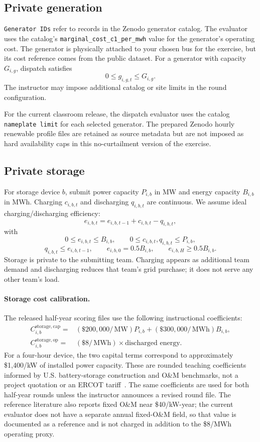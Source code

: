 \documentclass[12pt]{article}
\newcommand{\code}[1]{\texttt{#1}}
\newcommand{\MW}{\,\mathrm{MW}}
\newcommand{\MWh}{\,\mathrm{MWh}}
\newcommand{\USD}{\$}
\begin{document}
\subsection{Private generation}

\code{Generator IDs} refer to records in the Zenodo generator catalog. The evaluator
uses the catalog's \code{marginal\_cost\_c1\_per\_mwh} value for the generator's
operating cost. The generator is physically attached to your chosen bus for the
exercise, but its cost reference comes from the public dataset. For a generator
with capacity $G_{i,g}$, dispatch satisfies
\[
  0\le g_{i,g,t}\le G_{i,g}.
\]
The instructor may impose additional catalog or site limits in the round
configuration.

For the current classroom release, the dispatch evaluator uses the catalog
\code{nameplate limit} for each selected generator. The prepared Zenodo hourly
renewable profile files are retained as source metadata but are not imposed as
hard availability caps in this no-curtailment version of the exercise.

\subsection{Private storage}

For storage device $b$, submit power capacity $P_{i,b}$ in MW and energy
capacity $B_{i,b}$ in MWh. Charging $c_{i,b,t}$ and discharging $q_{i,b,t}$ are
continuous. We assume ideal charging/discharging efficiency:
\[
  e_{i,b,t}=e_{i,b,t-1}+c_{i,b,t}-q_{i,b,t},
\]
with
\[
  0\le e_{i,b,t}\le B_{i,b},\qquad
  0\le c_{i,b,t},q_{i,b,t}\le P_{i,b},
\]
\[
  q_{i,b,t}\le e_{i,b,t-1},\qquad
  e_{i,b,0}=0.5B_{i,b},\qquad
  e_{i,b,H}\ge 0.5B_{i,b}.
\]
Storage is private to the submitting team. Charging appears as additional
team demand and discharging reduces that team's grid purchase; it does not
serve any other team's load.

\paragraph{Storage cost calibration.} The released half-year scoring files use
the following instructional coefficients:
\begin{align*}
 C^{\mathrm{storage,cap}}_{i,b}={}&
 (\USD200{,}000/\MW)P_{i,b}
 +(\USD300{,}000/\MWh)B_{i,b},\\
 C^{\mathrm{storage,op}}_{i,b}={}&
 (\USD8/\MWh)\times\text{discharged energy}.
\end{align*}
For a four-hour device, the two capital terms correspond to approximately
\USD1,400/kW of installed power capacity. These are rounded teaching
coefficients informed by U.S. battery-storage construction and O\&M benchmarks,
not a project quotation or an ERCOT tariff~\cite{eia2024bess,nrel2021bess,
nrel2024bess}. The same coefficients are used for both half-year rounds unless
the instructor announces a revised round file. The reference literature also
reports fixed O\&M near \USD40/kW-year; the current evaluator does not have a
separate annual fixed-O\&M field, so that value is documented as a reference
and is not charged in addition to the \USD8/MWh operating proxy.
\end{document}
